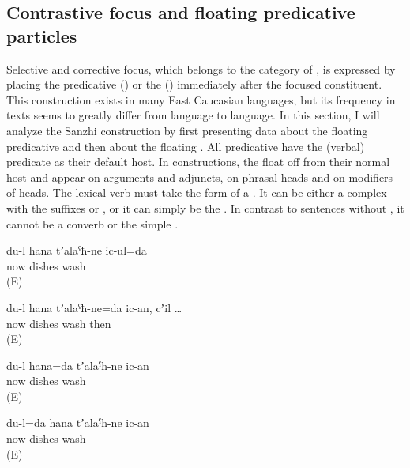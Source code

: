 
\subsection{Contrastive focus and floating predicative particles}
\label{ssec:Contrastive focus and floating predicative particles}

Selective and corrective focus, which belongs to the category of , is expressed by placing the predicative  () or the  () immediately after the focused constituent. This construction exists in many East Caucasian languages, but its frequency in texts seems to greatly differ from language to language. In this section, I will analyze the Sanzhi construction by first presenting data about the floating predicative  and then about the floating . All predicative  have the (verbal) predicate as their default host. In  constructions, the  float off from their normal host and appear on arguments and adjuncts, on phrasal heads and on modifiers of heads. The lexical verb must take the form of a  . It can be either a complex  with the suffixes  or , or it can simply be the . In contrast to sentences without , it cannot be a converb or the simple .
%
\begin{exe}
	\ex	\label{ex:Now I am cleaning the dishes@3}
	\gll	du-l 	hana 	tʼalaˁħ-ne 	ic-ul=da\\
			now	dishes	wash\\
	\glt	{} (E)

	\ex	\label{ex:Now I am cleaning the dishes@4}
	\gll	du-l 	hana	tʼalaˁħ-ne=da	ic-an,	cʼil	\ldots\\
			now	dishes	wash	then\\
	\glt	{} (E)

	\ex	\label{ex:NOW I am washing the dishes@5}
	\gll	du-l	hana=da	tʼalaˁħ-ne	ic-an\\
			now	dishes	wash\\
	\glt	{} (E)

	\ex	\label{ex:It is ME who is washing the dishes now@6}
	\gll	du-l=da	hana	tʼalaˁħ-ne	ic-an\\
			now	dishes	wash\\
	\glt	{} (E)
\end{exe}

